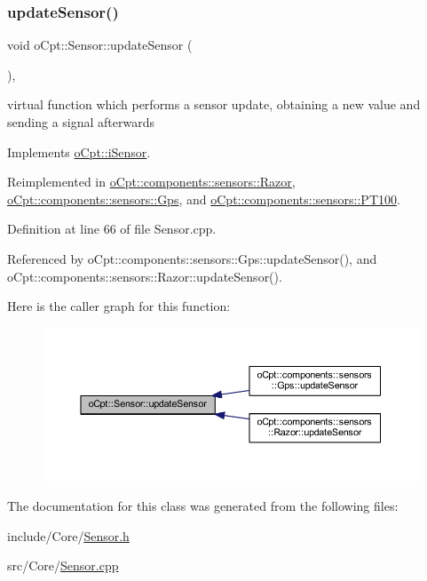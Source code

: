 \subsubsection{\texorpdfstring{update\+Sensor()}{updateSensor()}}
{\footnotesize\ttfamily void o\+Cpt\+::\+Sensor\+::update\+Sensor (\begin{DoxyParamCaption}{ }\end{DoxyParamCaption})\hspace{0.3cm}{\ttfamily [override]}, {\ttfamily [virtual]}}

virtual function which performs a sensor update, obtaining a new value and sending a signal afterwards 

Implements \hyperlink{classo_cpt_1_1i_sensor_aa55bc04979e4852989af2bd4f64e70bc}{o\+Cpt\+::i\+Sensor}.



Reimplemented in \hyperlink{classo_cpt_1_1components_1_1sensors_1_1_razor_ac8ee1582eb5c478c73e5e050858d2d7d}{o\+Cpt\+::components\+::sensors\+::\+Razor}, \hyperlink{classo_cpt_1_1components_1_1sensors_1_1_gps_a95976c5d8bba650d2732d4eb43979283}{o\+Cpt\+::components\+::sensors\+::\+Gps}, and \hyperlink{classo_cpt_1_1components_1_1sensors_1_1_p_t100_a66619675288a5344a55242d9bf097aee}{o\+Cpt\+::components\+::sensors\+::\+P\+T100}.



Definition at line 66 of file Sensor.\+cpp.



Referenced by o\+Cpt\+::components\+::sensors\+::\+Gps\+::update\+Sensor(), and o\+Cpt\+::components\+::sensors\+::\+Razor\+::update\+Sensor().

Here is the caller graph for this function\+:\nopagebreak
\begin{figure}[H]
\begin{center}
\leavevmode
\includegraphics[width=350pt]{classo_cpt_1_1_sensor_ab4b0dedb06f11bcf2368852035beb2b2_icgraph}
\end{center}
\end{figure}


The documentation for this class was generated from the following files\+:\begin{DoxyCompactItemize}
\item 
include/\+Core/\hyperlink{_sensor_8h}{Sensor.\+h}\item 
src/\+Core/\hyperlink{_sensor_8cpp}{Sensor.\+cpp}\end{DoxyCompactItemize}
